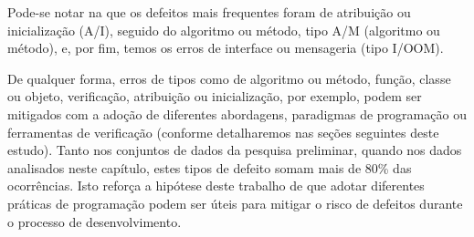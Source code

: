 Pode-se notar na  que os defeitos mais frequentes foram de atribuição ou inicialização (A/I), seguido do algoritmo ou método, tipo A/M (algoritmo ou método), e, por fim, temos os erros de interface ou mensageria (tipo I/OOM).

De qualquer forma, erros de tipos como de algoritmo ou método, função, classe ou objeto, verificação, atribuição ou inicialização, por exemplo, podem ser mitigados com a adoção de diferentes abordagens, paradigmas de programação ou ferramentas de verificação (conforme detalharemos nas seções seguintes deste estudo). Tanto nos conjuntos de dados da pesquisa preliminar, quando nos dados analisados neste capítulo, estes tipos de defeito somam mais de 80\% das ocorrências. Isto reforça a hipótese deste trabalho de que adotar diferentes práticas de programação podem ser úteis para mitigar o risco de defeitos durante o processo de desenvolvimento.
